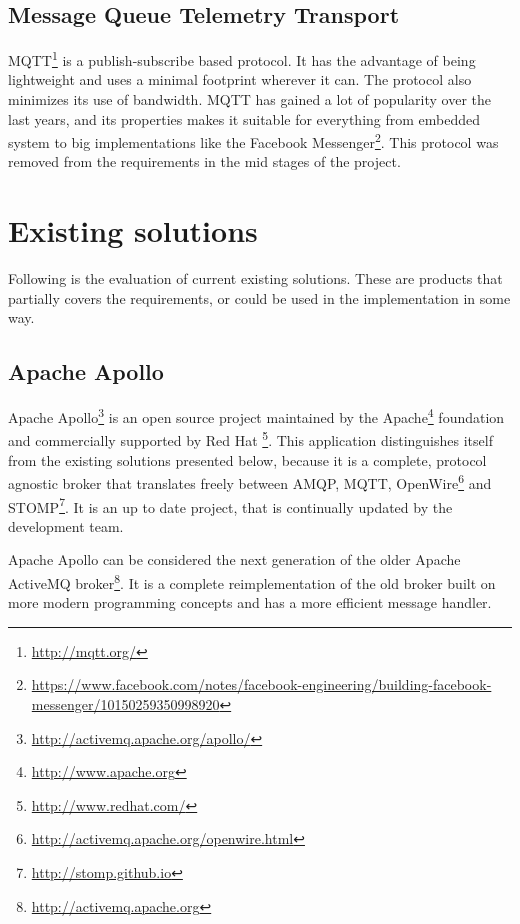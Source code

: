 \subsection{Message Queue Telemetry Transport}
\label{subsec:prestudies-mqtt}
MQTT\footnote{\url{http://mqtt.org/}} is a publish-subscribe based protocol. It has the advantage of being lightweight and uses a minimal footprint wherever it can. The protocol also minimizes its use of bandwidth. MQTT has gained a lot of popularity over the last years, and its properties makes it suitable for everything from embedded system to big implementations like the Facebook Messenger\footnote{\url{https://www.facebook.com/notes/facebook-engineering/building-facebook-messenger/10150259350998920}}. This protocol was removed from the requirements in the mid stages of the project.

\section{Existing solutions}
\label{subsec:prestudies-existing_solutions}

Following is the evaluation of current existing solutions. These are products that partially covers the requirements, or could be used in the implementation in some way.

\subsection{Apache Apollo}
\label{subsec:prestudies-existing_solutions-apache_apollo}

Apache Apollo\footnote{\url{http://activemq.apache.org/apollo/}} is an open source project maintained by the Apache\footnote{\url{http://www.apache.org}} foundation and commercially supported by Red Hat \footnote{\url{http://www.redhat.com/}}. This application distinguishes itself from the existing solutions presented below, because it is a complete, protocol agnostic broker that translates freely between AMQP, MQTT, OpenWire\footnote{\url{http://activemq.apache.org/openwire.html}} and STOMP\footnote{\url{http://stomp.github.io}}. It is an up to date project, that is continually updated by the development team.

Apache Apollo can be considered the next generation of the older Apache ActiveMQ broker\footnote{\url{http://activemq.apache.org}}. It is a complete reimplementation of the old broker built on more modern programming concepts and has a more efficient message handler.    

